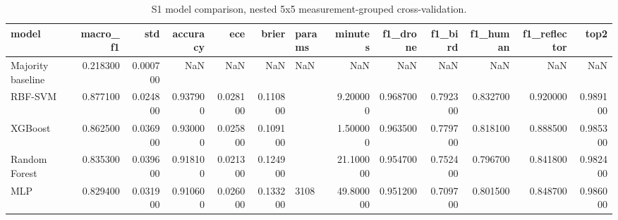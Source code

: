 \begin{table}
\caption{S1 model comparison, nested 5x5 measurement-grouped cross-validation.}
\label{tab:s1_main}
\begin{tabular}{lrrrrrlrrrrrr}
\toprule
model & macro\_f1 & std & accuracy & ece & brier & params & minutes & f1\_drone & f1\_bird & f1\_human & f1\_reflector & top2 \\
\midrule
Majority baseline & 0.218300 & 0.000700 & NaN & NaN & NaN & NaN & NaN & NaN & NaN & NaN & NaN & NaN \\
RBF-SVM & 0.877100 & 0.024800 & 0.937900 & 0.028100 & 0.110800 &  & 9.200000 & 0.968700 & 0.792300 & 0.832700 & 0.920000 & 0.989100 \\
XGBoost & 0.862500 & 0.036900 & 0.930000 & 0.025800 & 0.109100 &  & 1.500000 & 0.963500 & 0.779700 & 0.818100 & 0.888500 & 0.985300 \\
Random Forest & 0.835300 & 0.039600 & 0.918100 & 0.021300 & 0.124900 &  & 21.100000 & 0.954700 & 0.752400 & 0.796700 & 0.841800 & 0.982400 \\
MLP & 0.829400 & 0.031900 & 0.910600 & 0.026000 & 0.133200 & 3108 & 49.800000 & 0.951200 & 0.709700 & 0.801500 & 0.848700 & 0.986000 \\
\bottomrule
\end{tabular}
\end{table}
